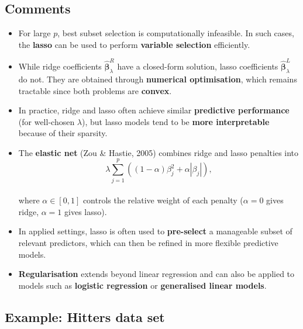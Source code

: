 \documentclass[
  letterpaper,
  DIV=11,
  numbers=noendperiod]{scrartcl}
\providecommand{\tightlist}{%
  \setlength{\itemsep}{0pt}\setlength{\parskip}{0pt}}\usepackage{longtable,booktabs,array}
\begin{document}
\subsection{Comments}\label{comments}

\begin{itemize}
\tightlist
\item
  For large \(p\), best subset selection is computationally infeasible.
  In such cases, the \textbf{lasso} can be used to perform
  \textbf{variable selection} efficiently.
\item
  While ridge coefficients \(\hat{\boldsymbol{\beta}}^{R}_{\lambda}\)
  have a closed-form solution, lasso coefficients
  \(\hat{\boldsymbol{\beta}}^{L}_{\lambda}\) do not. They are obtained
  through \textbf{numerical optimisation}, which remains tractable since
  both problems are \textbf{convex}.
\item
  In practice, ridge and lasso often achieve similar \textbf{predictive
  performance} (for well-chosen \(\lambda\)), but lasso models tend to
  be \textbf{more interpretable} because of their sparsity.
\item
  The \textbf{elastic net} (Zou \& Hastie, 2005) combines ridge and
  lasso penalties into\\
  \[ \lambda \sum_{j=1}^{p} \left((1 - \alpha)\beta_j^2 + \alpha|\beta_j|\right), \]\\
  where \(\alpha \in [0,1]\) controls the relative weight of each
  penalty (\(\alpha = 0\) gives ridge, \(\alpha = 1\) gives lasso).
\item
  In applied settings, lasso is often used to \textbf{pre-select} a
  manageable subset of relevant predictors, which can then be refined in
  more flexible predictive models.
\item
  \textbf{Regularisation} extends beyond linear regression and can also
  be applied to models such as \textbf{logistic regression} or
  \textbf{generalised linear models}.
\end{itemize}

\subsection{Example: Hitters data set}\label{example-hitters-data-set}
\end{document}
